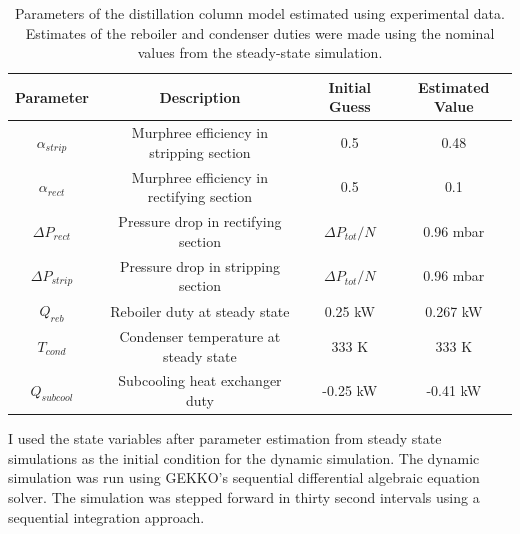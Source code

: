 \begin{table}
    \centering
    \caption{Parameters of the distillation column model estimated using experimental data. Estimates of the reboiler and condenser duties were made using the nominal values from the steady-state simulation.}
    \begin{tabular}{cccc}
        \textbf{Parameter} & \textbf{Description} & \textbf{Initial Guess} & \textbf{Estimated Value}  \\
        \hline
         $\alpha_{strip}$ & Murphree efficiency in stripping section &  0.5 & 0.48 \\ 
         $\alpha_{rect}$ & Murphree efficiency in rectifying section & 0.5 & 0.1 \\
         $\Delta P_{rect}$ & Pressure drop in rectifying section &  $\Delta P_{tot}/N$ & 0.96 mbar \\ 
         $\Delta P_{strip}$ & Pressure drop in stripping section &  $\Delta P_{tot}/N$ & 0.96 mbar \\ 
         $ Q_{reb}$ & Reboiler duty at steady state &  0.25 kW  & 0.267 kW  \\
         $ T_{cond}$ & Condenser temperature at steady state &  333 K  & 333 K\\
         $ Q_{subcool}$ & Subcooling heat exchanger duty & -0.25  kW & -0.41 kW \\
         \hline
    \end{tabular}
    \label{tab:param_estimation}
\end{table}

I used the state variables after parameter estimation from steady state simulations as the initial condition for the dynamic simulation. The dynamic simulation was run using GEKKO's sequential differential algebraic equation solver. The simulation was stepped forward in thirty second intervals using a sequential integration approach. 



